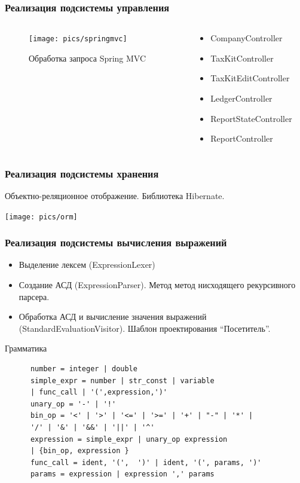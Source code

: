 \documentclass[xcolor=pdftex, dvipsnames, table]{beamer}
\begin{document}
\begin{frame}
  \frametitle{Реализация подсистемы управления}
  \begin{columns}
    \begin{column}{0.6\textwidth}
      \begin{center}
        \begin{figure}
          \texttt{[image: pics/springmvc]}
          \caption{Обработка запроса Spring MVC}
          \label{pic:springmvc}
        \end{figure}
      \end{center}
    \end{column}
    \begin{column}{0.5\textwidth}
      \begin{itemize}
        \item CompanyController
        \item TaxKitController
        \item TaxKitEditController
        \item LedgerController
        \item ReportStateController
        \item ReportController
      \end{itemize}
    \end{column}
  \end{columns}
\end{frame}

\begin{frame}
  \frametitle{Реализация подсистемы хранения}
  Объектно-реляционное отображение.  Библиотека Hibernate.
  \begin{center}
    \texttt{[image: pics/orm]}
  \end{center}
\end{frame}

\begin{frame}[fragile]
  \frametitle{Реализация подсистемы вычисления выражений}
  \begin{itemize}
    \item Выделение лексем (ExpressionLexer)
    \item Создание АСД (ExpressionParser). Метод метод нисходящего рекурсивного парсера.
    \item Обработка АСД и вычисление значения выражений (StandardEvaluationVisitor). Шаблон проектирования ``Посетитель''.
  \end{itemize}

  \begin{exampleblock}{Грамматика}
    \begin{verbatim}
      number = integer | double
      simple_expr = number | str_const | variable
      | func_call | '(',expression,')'
      unary_op = '-' | '!'
      bin_op = '<' | '>' | '<=' | '>=' | '+' | "-" | '*' |
      '/' | '&' | '&&' | '||' | '^'
      expression = simple_expr | unary_op expression
      | {bin_op, expression }
      func_call = ident, '(',  ')' | ident, '(', params, ')'
      params = expression | expression ',' params
    \end{verbatim}
  \end{exampleblock}
\end{frame}
\end{document}
